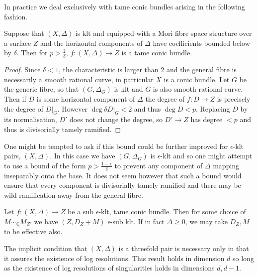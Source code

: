 \documentclass[a4paper,12pt]{book}
\begin{document}
In practice we deal exclusively with tame conic bundles arising in the following fashion.

\begin{lemma}\label{S2}
	Suppose that $(X,\Delta)$ is klt and equipped with a Mori fibre space structure over a surface $Z$ and the horizontal components of $\Delta$ have coefficients bounded below by $\delta$. Then for $p > \frac{2}{\delta}$, $f\colon (X,\Delta) \to Z$ is a tame conic bundle.
\end{lemma}
\begin{proof}
	
	Since $\delta <1$, the characteristic is larger than $2$ and the general fibre is necessarily a smooth rational curve, in particular $X$ is a conic bundle. Let $G$ be the generic fibre, so that $(G,\Delta_{G})$ is klt and $G$ is also smooth rational curve. Then if $D$ is some horizontal component of $\Delta$ the degree of $f\colon D \to Z$ is precisely the degree of $D|_{G}$. However $\deg \delta D|_{G} <2$ and thus $\deg D < p$. Replacing $D$ by its normalisation, $D'$ does not change the degree, so $D'\to Z$ has degree $<p$ and thus is divisorially tamely ramified.
\end{proof}

\begin{remark}
	One might be tempted to ask if this bound could be further improved for $\epsilon$-klt pairs, $(X,\Delta)$. In this case we have $(G,\Delta_{G})$ is $\epsilon$-klt and so one might attempt to use a bound of the form $p > \frac{1-\epsilon}{\delta}$ to prevent any component of $\Delta$ mapping inseparably onto the base. It does not seem however that such a bound would ensure that every component is divisorially tamely ramified and there may be wild ramification away from the general fibre. 
\end{remark}

\begin{theorem}\label{cbf}
	Let $f\colon (X,\Delta) \to Z$ be a sub $\epsilon$-klt, tame conic bundle. Then for some choice of $M\sim_{\mathbb{Q}} M_{Z'}$ we have $(Z,D_{Z}+M)$ $\epsilon$-sub klt. If in fact $\Delta \geq 0$, we may take $D_{Z},M$ to be effective also.
\end{theorem}
\begin{remark}
	The implicit condition that $(X,\Delta)$ is a threefold pair is necessary only in that it assures the existence of log resolutions. This result holds in dimension $d$ so long as the existence of log resolutions of singularities holds in dimensions $d,d-1$.
\end{remark}
\end{document}
